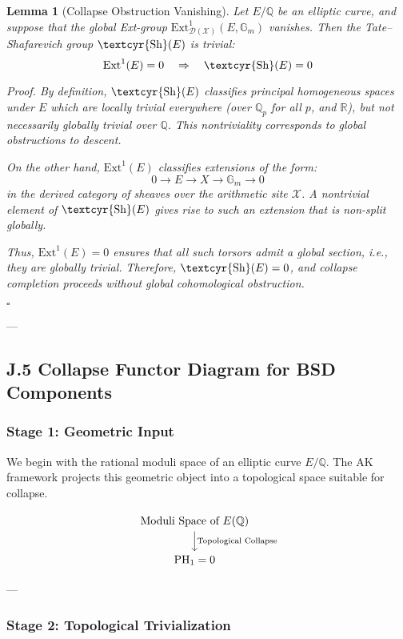 \documentclass[11pt]{article}
\newtheorem{lemma}[theorem]{Lemma}
\newcommand{\Sha}{\text{\textcyr{Sh}}}
\begin{document}
\begin{lemma}[Collapse Obstruction Vanishing]
Let $E/\mathbb{Q}$ be an elliptic curve, and suppose that the global Ext-group $\mathrm{Ext}^1_{\mathcal{D}(\mathcal{X})}(E, \mathbb{G}_m)$ vanishes. Then the Tate–Shafarevich group $\Sha(E)$ is trivial:
\[
\mathrm{Ext}^1(E) = 0 \quad \Rightarrow \quad \Sha(E) = 0
\]

\textit{Proof.}  
By definition, $\Sha(E)$ classifies principal homogeneous spaces under $E$ which are locally trivial everywhere (over $\mathbb{Q}_p$ for all $p$, and $\mathbb{R}$), but not necessarily globally trivial over $\mathbb{Q}$. This nontriviality corresponds to global obstructions to descent.

On the other hand, $\mathrm{Ext}^1(E)$ classifies extensions of the form:
\[
0 \to E \to X \to \mathbb{G}_m \to 0
\]
in the derived category of sheaves over the arithmetic site $\mathcal{X}$. A nontrivial element of $\Sha(E)$ gives rise to such an extension that is non-split globally.

Thus, $\mathrm{Ext}^1(E) = 0$ ensures that all such torsors admit a global section, i.e., they are globally trivial. Therefore, $\Sha(E) = 0$, and collapse completion proceeds without global cohomological obstruction.

\hfill$\square$
\end{lemma}


---

\subsection*{J.5 Collapse Functor Diagram for BSD Components}

\subsubsection*{Stage 1: Geometric Input}

We begin with the rational moduli space of an elliptic curve $E/\mathbb{Q}$.  
The AK framework projects this geometric object into a topological space suitable for collapse.

\[
\begin{tikzcd}
\text{Moduli Space of } E(\mathbb{Q}) \arrow[d, "\text{Topological Collapse}"]
\\
\mathrm{PH}_1 = 0
\end{tikzcd}
\]

---

\subsubsection*{Stage 2: Topological Trivialization}
\end{document}
